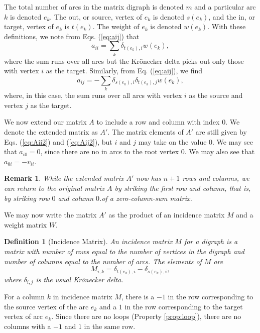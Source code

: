 \documentclass{article}
\newtheorem{defn}{Definition}
\newtheorem{remark}{Remark}
\begin{document}
The total number of arcs in the matrix digraph is denoted
$m$ and a particular arc $k$ is denoted $e_k$.  The out,
or source, vertex of $e_k$ is denoted $s(e_k)$, and the in, or target,
vertex of $e_k$ is $t(e_k)$.  The weight of $e_k$ is denoted $w(e_k)$.
With these definitions, we note from Eqs. (\ref{eq:aij}) that
\begin{equation}
a_{ii} = \sum_k \delta_{t(e_k),i} w(e_k),
\label{eq:Aii2}
\end{equation}
where the sum runs over all arcs but the Kr\"onecker delta picks out
only those with vertex $i$ as the target.
Similarly, from Eq. (\ref{eq:aij}), we find
\begin{equation}
a_{ij} = -\sum_k \delta_{s(e_k),i} \delta_{t(e_k),j}
w(e_k),
\label{eq:Aij2}
\end{equation}
where, in this case, the sum runs over all arcs with vertex $i$
as the source and vertex $j$ as the target.

We now extend our matrix $A$
to include a row and column with index $0$.
We denote the extended matrix as $A'$.  The matrix elements of $A'$ are
still given by Eqs. (\ref{eq:Aii2}) and (\ref{eq:Aij2}), but $i$ and $j$ may
take on the value $0$.  We may see that $a_{i0} = 0$, since there are no
in arcs to the root vertex $0$.  We may also see that $a_{0i} = -v_{ii}$.

\begin{remark}
While the extended matrix $A'$ now has $n + 1$ rows and columns,
we can return
to the original matrix $A$ by striking the first row and column,
that is, by striking row $0$ and column $0$.of a zero-column-sum matrix. 
\label{rem:extended}
\end{remark}

We may now write the matrix $A'$ as the product of
an incidence matrix $M$ and a weight matrix $W$.

\begin{defn}[Incidence Matrix]
An incidence matrix $M$ for a digraph
is a matrix with number of rows equal to the number of vertices in
the digraph and number of columns equal to the number of arcs.
The elements of $M$ are
\begin{equation}
M_{i,k} = \delta_{t(e_k),i} - \delta_{s(e_k),i},
\label{eq:incidence_matrix}
\end{equation}
where $\delta_{i,j}$ is the usual Kr\"onecker delta.
\label{defn:M}
\end{defn}

For a column $k$ in incidence matrix $M$,
there is a $-1$ in the row corresponding to the source vertex of the
arc $e_k$ and a $1$ in the row corresponding to the target vertex of
arc $e_k$.  Since there are no loops (Property \ref{prop:loop}),
there are no columns with a $-1$ and $1$ in the same row.
\end{document}
